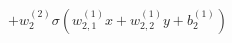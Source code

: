 \documentclass[preview]{standalone}
\begin{document}
\begin{align*}
+ w_2^{(2)} \sigma(w_{2,1}^{(1)}x + w_{2,2}^{(1)}y +b_2^{(1)})
\end{align*}
\end{document}
